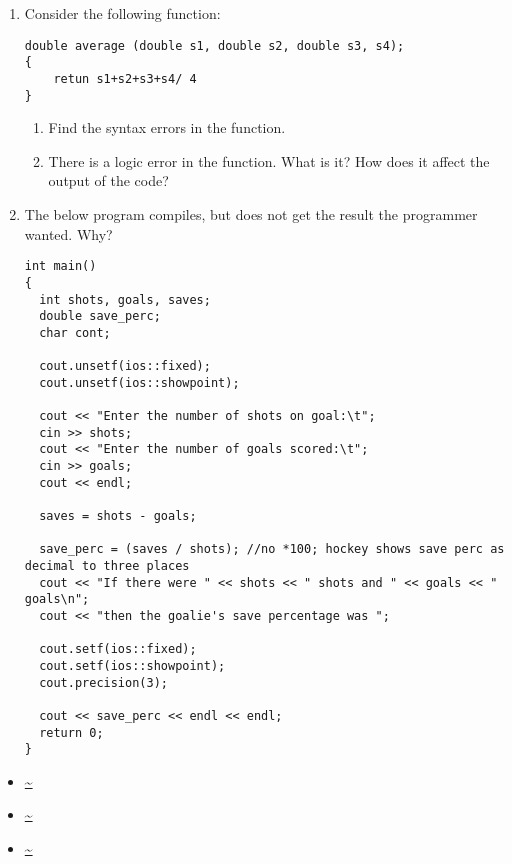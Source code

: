 \begin{enumerate}
	\item Consider the following function:
\begin{lstlisting}
double average (double s1, double s2, double s3, s4);
{
    retun s1+s2+s3+s4/ 4
}
\end{lstlisting}
		\begin{enumerate}
		\item Find the syntax errors in the function.
		\item There is a logic error in the function. What is it? How does it affect the output of the code?
		\end{enumerate}

  \item The below program compiles, but does not get the result the programmer wanted. Why?

\begin{lstlisting}
int main()
{
  int shots, goals, saves;
  double save_perc;
  char cont;

  cout.unsetf(ios::fixed);
  cout.unsetf(ios::showpoint);

  cout << "Enter the number of shots on goal:\t";
  cin >> shots;
  cout << "Enter the number of goals scored:\t";
  cin >> goals;
  cout << endl;

  saves = shots - goals;

  save_perc = (saves / shots); //no *100; hockey shows save perc as decimal to three places
  cout << "If there were " << shots << " shots and " << goals << " goals\n";
  cout << "then the goalie's save percentage was ";

  cout.setf(ios::fixed);
  cout.setf(ios::showpoint);
  cout.precision(3);
  
  cout << save_perc << endl << endl;
  return 0;
}
\end{lstlisting}

\end{enumerate}





\begin{itemize}
\item \url{~}
\item \url{~}
\item \url{~}
\end{itemize}	

